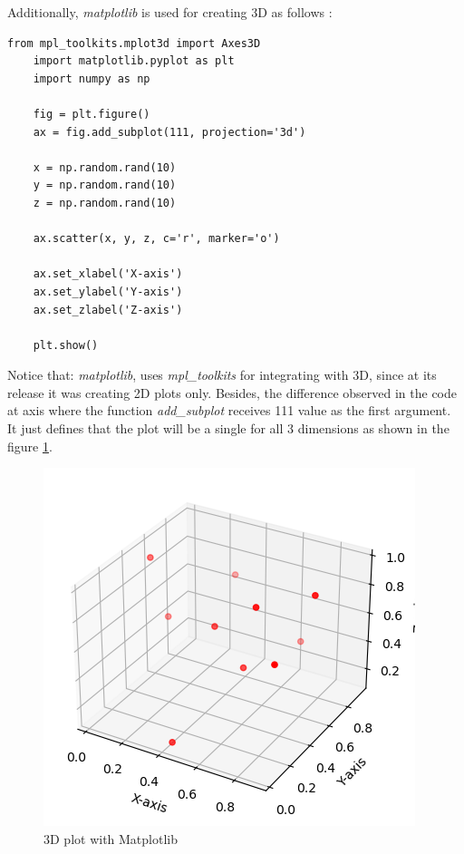 \documentclass[12pt,a4paper]{report}
\begin{document}
Additionally, \textit{matplotlib} is used for creating 3D as follows : 
\begin{lstlisting}[style=stylepython]
	from mpl_toolkits.mplot3d import Axes3D
	import matplotlib.pyplot as plt
	import numpy as np
	
	fig = plt.figure()
	ax = fig.add_subplot(111, projection='3d')
	
	x = np.random.rand(10)
	y = np.random.rand(10)
	z = np.random.rand(10)
	
	ax.scatter(x, y, z, c='r', marker='o')
	
	ax.set_xlabel('X-axis')
	ax.set_ylabel('Y-axis')
	ax.set_zlabel('Z-axis')
	
	plt.show()
\end{lstlisting} 
Notice that: \textit{matplotlib}, uses \textit{mpl\_toolkits} for integrating with 3D, since at its release it was creating 2D plots only. 
Besides, the difference observed in the code at axis where the function \textit{add\_subplot} receives 111 value as the first argument. It just defines that the plot will be a single for all 3 dimensions as shown in the figure \ref{fig:3ddimensionPlotlib}. 
\begin{figure}
	\centering
	\includegraphics[width=0.7\linewidth]{3Ddimension}
	\caption{3D plot with Matplotlib}
	\label{fig:3ddimensionPlotlib}
\end{figure}
\end{document}
